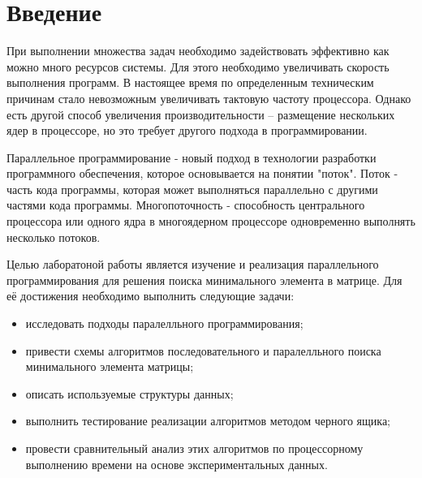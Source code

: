 \chapter*{Введение}
При выполнении множества задач необходимо задействовать эффективно как можно много ресурсов системы. Для этого необходимо увеличивать скорость выполнения программ. В настоящее время по определенным техническим причинам стало невозможным увеличивать тактовую частоту процессора. Однако есть другой способ увеличения производительности – размещение нескольких ядер в процессоре, но это требует другого подхода в программировании.

Параллельное программирование - новый подход в технологии разработки программного обеспечения, которое основывается на понятии "поток"\cite{parallel}. Поток - часть кода программы, которая может выполняться параллельно с другими частями кода программы. Многопоточность - способность центрального процессора или одного ядра в многоядерном процессоре одновременно выполнять несколько потоков.

Целью лаборатоной работы является изучение и реализация параллельного программирования для решения поиска минимального элемента в матрице. Для её достижения необходимо выполнить следующие задачи:
\begin{itemize}
	\item исследовать подходы паралелльного программирования;
	\item привести схемы алгоритмов последовательного и паралелльного поиска минимального элемента матрицы;
	\item описать используемые структуры данных;
	\item выполнить тестирование реализации алгоритмов методом черного ящика;
	\item провести сравнительный анализ этих алгоритмов по процессорному выполнению времени на основе экспериментальных данных.
\end{itemize}